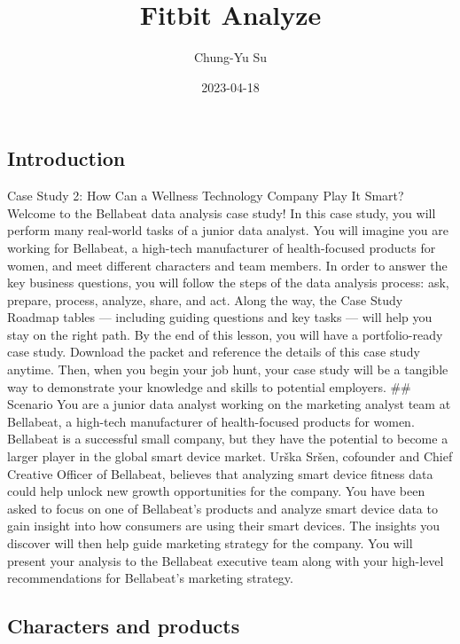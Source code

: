 \documentclass[
]{article}
\title{Fitbit Analyze}
\author{Chung-Yu Su}
\date{2023-04-18}
\begin{document}
\maketitle

\hypertarget{introduction}{%
\subsection{Introduction}\label{introduction}}

Case Study 2: How Can a Wellness Technology Company Play It Smart?
Welcome to the Bellabeat data analysis case study! In this case study,
you will perform many real-world tasks of a junior data analyst. You
will imagine you are working for Bellabeat, a high-tech manufacturer of
health-focused products for women, and meet different characters and
team members. In order to answer the key business questions, you will
follow the steps of the data analysis process: ask, prepare, process,
analyze, share, and act. Along the way, the Case Study Roadmap tables
--- including guiding questions and key tasks --- will help you stay on
the right path. By the end of this lesson, you will have a
portfolio-ready case study. Download the packet and reference the
details of this case study anytime. Then, when you begin your job hunt,
your case study will be a tangible way to demonstrate your knowledge and
skills to potential employers. \#\# Scenario You are a junior data
analyst working on the marketing analyst team at Bellabeat, a high-tech
manufacturer of health-focused products for women. Bellabeat is a
successful small company, but they have the potential to become a larger
player in the global smart device market. Urška Sršen, cofounder and
Chief Creative Officer of Bellabeat, believes that analyzing smart
device fitness data could help unlock new growth opportunities for the
company. You have been asked to focus on one of Bellabeat's products and
analyze smart device data to gain insight into how consumers are using
their smart devices. The insights you discover will then help guide
marketing strategy for the company. You will present your analysis to
the Bellabeat executive team along with your high-level recommendations
for Bellabeat's marketing strategy.

\hypertarget{characters-and-products}{%
\subsection{Characters and products}\label{characters-and-products}}
\end{document}
